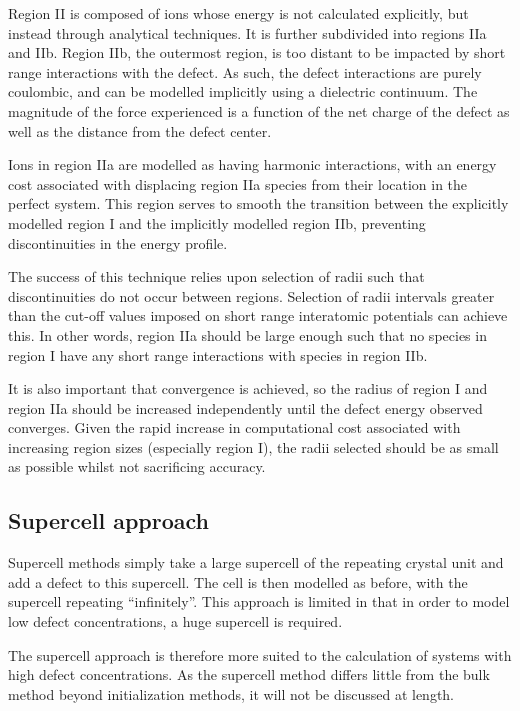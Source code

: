 Region II is composed of ions whose energy is not calculated explicitly, but instead through analytical techniques.
It is further subdivided into regions IIa and IIb.
Region IIb, the outermost region, is too distant to be impacted by short range interactions with the defect.
As such, the defect interactions are purely coulombic, and can be modelled implicitly using a dielectric continuum.
The magnitude of the force experienced is a function of the net charge of the defect as well as the distance from the defect center.


Ions in region IIa are modelled as having harmonic interactions, with an energy cost associated with displacing region IIa species from their location in the perfect system.
This region serves to smooth the transition between the explicitly modelled region I and the implicitly modelled region IIb, preventing discontinuities in the energy profile.

The success of this technique relies upon selection of radii such that discontinuities do not occur between regions.
Selection of radii intervals greater than the cut-off values imposed on short range interatomic potentials can achieve this.
In other words, region IIa should be large enough such that no species in region I have any short range interactions with species in region IIb.

It is also important that convergence is achieved, so the radius of region I and region IIa should be increased independently until the defect energy observed converges.
Given the rapid increase in computational cost associated with increasing region sizes (especially region I), the radii selected should be as small as possible whilst not sacrificing accuracy.

\subsection{Supercell approach}
Supercell methods simply take a large supercell of the repeating crystal unit and add a defect to this supercell.
The cell is then modelled as before, with the supercell repeating ``infinitely''.
This approach is limited in that in order to model low defect concentrations, a huge supercell is required.

The supercell approach is therefore more suited to the calculation of systems with high defect concentrations.
As the supercell method differs little from the bulk method beyond initialization methods, it will not be discussed at length.

